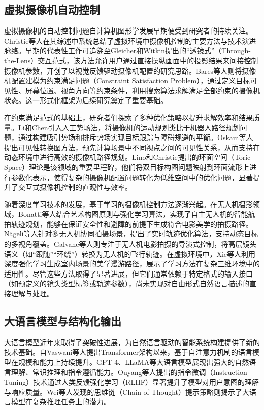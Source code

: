\subsection{虚拟摄像机自动控制}

虚拟摄像机的自动控制问题自计算机图形学发展早期便受到研究者的持续关注。Christie等人\cite{christie2008camera}在其综述中系统总结了虚拟环境中摄像机控制的主要方法与技术演进脉络。早期的代表性工作可追溯至Gleicher和Witkin\cite{gleicher1992through}提出的“透镜式”（Through-the-Lens）交互范式，该方法允许用户通过直接操纵画面中的投影结果来间接控制摄像机参数，开创了以视觉反馈驱动摄像机配置的研究思路。Bares等人\cite{bares1999constraint}则将摄像机配置建模为约束满足问题（Constraint Satisfaction Problem），通过定义目标可见性、屏幕位置、视角方向等约束条件，利用搜索算法求解满足全部约束的摄像机状态。这一形式化框架为后续研究奠定了重要基础。

在约束满足范式的基础上，研究者们探索了多种优化策略以提升求解效率和结果质量。Li和Chen\cite{li2008real}引入人工势场法，将摄像机的运动规划类比于机器人路径规划问题，通过构建吸引势场和排斥势场实现目标跟踪与障碍规避的平衡。Oskam等人\cite{oskam2009visibility}提出可见性转换图方法，预先计算场景中不同视点之间的可见性关系，从而支持在动态环境中进行高效的摄像机路径规划。Lino和Christie\cite{lino2015intuitive}提出的环面空间（Toric Space）理论是该领域的重要里程碑，他们将双目标构图问题映射到环面流形上进行参数化表示，使得复杂的摄像机配置问题转化为低维空间中的优化问题，显著提升了交互式摄像机控制的直观性与效率。

随着深度学习技术的发展，基于学习的摄像机控制方法逐渐兴起。在无人机摄影领域，Bonatti等人\cite{bonatti2020autonomous}结合艺术构图原则与强化学习算法，实现了自主无人机的智能航拍轨迹规划，能够在保证安全性和避障的前提下生成符合电影美学的拍摄路径。Nägeli等人\cite{nageli2017real}针对多无人机协同拍摄场景，提出了实时轨迹优化算法，支持动态目标的多视角覆盖。Galvane等人\cite{galvane2018directing}则专注于无人机电影拍摄的导演式控制，将高层镜头语义（如“跟随”“环绕”）转换为无人机的飞行轨迹。在虚拟环境中，Xie等人\cite{xie2023gait}利用深度强化学习生成室内场景的美学漫游路径，展示了学习方法在复杂三维环境中的适用性。尽管这些方法取得了显著进展，但它们通常依赖于特定格式的输入接口（如预定义的镜头类型标签或轨迹参数），尚未实现对自由形式自然语言描述的直接理解与处理。

\subsection{大语言模型与结构化输出}

大语言模型近年来取得了突破性进展，为自然语言驱动的智能系统构建提供了新的技术基础。自Vaswani等人\cite{vaswani2017attention}提出Transformer架构以来，基于自注意力机制的语言模型在规模和能力上持续提升。GPT-4\cite{openai2023gpt4}、LLaMA\cite{touvron2023llama,touvron2023llama2}等大语言模型展现出强大的自然语言理解、常识推理和指令遵循能力。Ouyang等人\cite{ouyang2022training}提出的指令微调（Instruction Tuning）技术通过人类反馈强化学习（RLHF）显著提升了模型对用户意图的理解与响应质量。Wei等人\cite{wei2022chain}发现的思维链（Chain-of-Thought）提示策略则揭示了大语言模型在复杂推理任务上的潜力。

